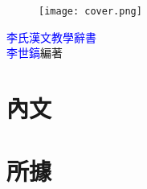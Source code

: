 \documentclass[a4paper,11pt]{book}
\begin{document}
\frontmatter
\linespread{1.25}
\begin{wrapfigure}{r}{60mm}
\texttt{[image: cover.png]}
\end{wrapfigure}
\hfill
\vfill
{\Huge\textcolor{blue}{李氏漢文教學辭書}}\\
{\textcolor{blue}{李世鎬}\hspace{14pt}編著}
\vspace{64pt}
\newpage
\addtolength{\topmargin}{20mm}
\mainmatter
\linespread{1.25}


\chapter*{內文}
\begin{multicols}{3}

\end{multicols}

\chapter*{所據}


\end{document}
